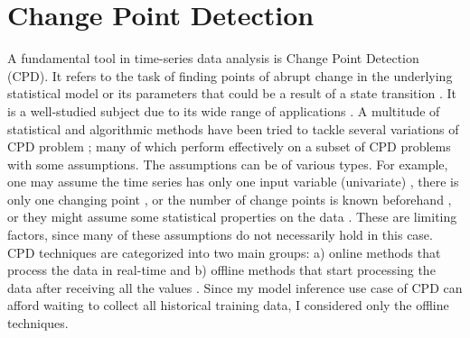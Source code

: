 \section{Change Point Detection}
A fundamental tool in time-series data analysis is Change Point Detection (CPD). It refers to the task of finding points of abrupt change in the underlying statistical model or its parameters that could be a result of a state transition \cite{aminikhanghahi2017survey}. It is a well-studied subject due to its wide range of applications \cite{basseville1993detection}.
A multitude of statistical and algorithmic methods have been tried to tackle several variations of CPD problem \cite{chen2011parametric, hasan2014information, hsu1982bayesian, lee2017implicit, oh2002analyzing, ramos2016anomalies, chowdhury2012bayesian, reeves2007review, rosenfield2010change, wang2011non, xie2013sequential, yamanishi2004line, Lavielle1999}; many of which perform effectively on a subset of CPD problems with some assumptions. The assumptions can be of various types. For example, one may assume the time series has only one input variable (univariate) \cite{fryzlewicz2014wild}, there is only one changing point \cite{bai1998testing}, or the number of change points is known beforehand \cite{lavielle2005using}, or they might assume some statistical properties on the data \cite{chen2011parametric, takeuchi2006unifying, ide2007change}. These are limiting factors, since many of these assumptions do not necessarily hold in this case. CPD techniques are categorized into two main groups: a) online methods that process the data in real-time and b) offline methods that start processing the data after receiving all the values \cite{Truong2018ChangePointSurvey}. Since my model inference use case of CPD can afford waiting to collect all historical training data, I considered only the offline techniques. %

